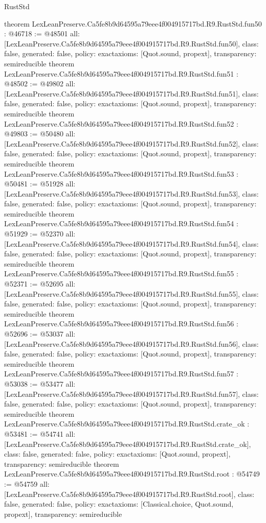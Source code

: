 \begin{lexlean}{RustStd}
\begin{coremodule}
{}
theorem LexLeanPreserve.Ca5fe8b9d64595a79eee4f004915717bd.R9.RustStd.fun50 : @46718 := @48501 {
  all: [LexLeanPreserve.Ca5fe8b9d64595a79eee4f004915717bd.R9.RustStd.fun50],
  class: false,
  generated: false,
  policy: exact{axioms: [Quot.sound, propext]},
  transparency: semireducible
}
theorem LexLeanPreserve.Ca5fe8b9d64595a79eee4f004915717bd.R9.RustStd.fun51 : @48502 := @49802 {
  all: [LexLeanPreserve.Ca5fe8b9d64595a79eee4f004915717bd.R9.RustStd.fun51],
  class: false,
  generated: false,
  policy: exact{axioms: [Quot.sound, propext]},
  transparency: semireducible
}
theorem LexLeanPreserve.Ca5fe8b9d64595a79eee4f004915717bd.R9.RustStd.fun52 : @49803 := @50480 {
  all: [LexLeanPreserve.Ca5fe8b9d64595a79eee4f004915717bd.R9.RustStd.fun52],
  class: false,
  generated: false,
  policy: exact{axioms: [Quot.sound, propext]},
  transparency: semireducible
}
theorem LexLeanPreserve.Ca5fe8b9d64595a79eee4f004915717bd.R9.RustStd.fun53 : @50481 := @51928 {
  all: [LexLeanPreserve.Ca5fe8b9d64595a79eee4f004915717bd.R9.RustStd.fun53],
  class: false,
  generated: false,
  policy: exact{axioms: [Quot.sound, propext]},
  transparency: semireducible
}
theorem LexLeanPreserve.Ca5fe8b9d64595a79eee4f004915717bd.R9.RustStd.fun54 : @51929 := @52370 {
  all: [LexLeanPreserve.Ca5fe8b9d64595a79eee4f004915717bd.R9.RustStd.fun54],
  class: false,
  generated: false,
  policy: exact{axioms: [Quot.sound, propext]},
  transparency: semireducible
}
theorem LexLeanPreserve.Ca5fe8b9d64595a79eee4f004915717bd.R9.RustStd.fun55 : @52371 := @52695 {
  all: [LexLeanPreserve.Ca5fe8b9d64595a79eee4f004915717bd.R9.RustStd.fun55],
  class: false,
  generated: false,
  policy: exact{axioms: [Quot.sound, propext]},
  transparency: semireducible
}
theorem LexLeanPreserve.Ca5fe8b9d64595a79eee4f004915717bd.R9.RustStd.fun56 : @52696 := @53037 {
  all: [LexLeanPreserve.Ca5fe8b9d64595a79eee4f004915717bd.R9.RustStd.fun56],
  class: false,
  generated: false,
  policy: exact{axioms: [Quot.sound, propext]},
  transparency: semireducible
}
theorem LexLeanPreserve.Ca5fe8b9d64595a79eee4f004915717bd.R9.RustStd.fun57 : @53038 := @53477 {
  all: [LexLeanPreserve.Ca5fe8b9d64595a79eee4f004915717bd.R9.RustStd.fun57],
  class: false,
  generated: false,
  policy: exact{axioms: [Quot.sound, propext]},
  transparency: semireducible
}
theorem LexLeanPreserve.Ca5fe8b9d64595a79eee4f004915717bd.R9.RustStd.crate_ok : @53481 := @54741 {
  all: [LexLeanPreserve.Ca5fe8b9d64595a79eee4f004915717bd.R9.RustStd.crate_ok],
  class: false,
  generated: false,
  policy: exact{axioms: [Quot.sound, propext]},
  transparency: semireducible
}
theorem LexLeanPreserve.Ca5fe8b9d64595a79eee4f004915717bd.R9.RustStd.root : @54749 := @54759 {
  all: [LexLeanPreserve.Ca5fe8b9d64595a79eee4f004915717bd.R9.RustStd.root],
  class: false,
  generated: false,
  policy: exact{axioms: [Classical.choice, Quot.sound, propext]},
  transparency: semireducible
}


\end{coremodule}
\end{lexlean}
